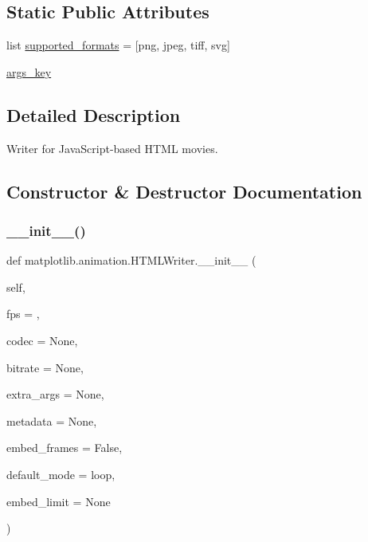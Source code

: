 \subsection*{Static Public Attributes}
\begin{DoxyCompactItemize}
\item 
list \hyperlink{classmatplotlib_1_1animation_1_1HTMLWriter_a430b3d8b4095529549a23fe474fb8ec4}{supported\+\_\+formats} = \mbox{[}\textquotesingle{}png\textquotesingle{}, \textquotesingle{}jpeg\textquotesingle{}, \textquotesingle{}tiff\textquotesingle{}, \textquotesingle{}svg\textquotesingle{}\mbox{]}
\item 
\hyperlink{classmatplotlib_1_1animation_1_1HTMLWriter_aa03ae925cd1eab428da31480697427e8}{args\+\_\+key}
\end{DoxyCompactItemize}


\subsection{Detailed Description}
\begin{DoxyVerb}Writer for JavaScript-based HTML movies.\end{DoxyVerb}
 

\subsection{Constructor \& Destructor Documentation}
\mbox{\label{classmatplotlib_1_1animation_1_1HTMLWriter_a67a530fcb4954309d15c532193337b26}} 
\subsubsection{\texorpdfstring{\+\_\+\+\_\+init\+\_\+\+\_\+()}{\_\_init\_\_()}}
{\footnotesize\ttfamily def matplotlib.\+animation.\+H\+T\+M\+L\+Writer.\+\_\+\+\_\+init\+\_\+\+\_\+ (\begin{DoxyParamCaption}\item[{}]{self,  }\item[{}]{fps = {},  }\item[{}]{codec = {\ttfamily None},  }\item[{}]{bitrate = {\ttfamily None},  }\item[{}]{extra\+\_\+args = {\ttfamily None},  }\item[{}]{metadata = {\ttfamily None},  }\item[{}]{embed\+\_\+frames = {\ttfamily False},  }\item[{}]{default\+\_\+mode = {\ttfamily \textquotesingle{}loop\textquotesingle{}},  }\item[{}]{embed\+\_\+limit = {\ttfamily None} }\end{DoxyParamCaption})}



